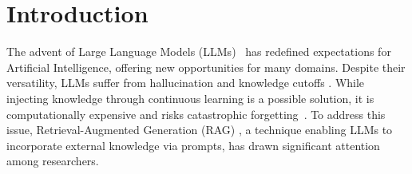 \section{Introduction}

The advent of Large Language Models (LLMs)~\cite{ouyang2022training,achiam2023gpt} has redefined expectations for Artificial Intelligence, offering new opportunities for many domains.
Despite their versatility, LLMs suffer from hallucination \cite{huang2025survey} and knowledge cutoffs \cite{cheng2024dated}.
While injecting knowledge through continuous learning is a possible solution, it is computationally expensive and risks catastrophic forgetting~\cite{kirkpatrick2017overcoming}.
To address this issue, Retrieval-Augmented Generation (RAG) \cite{guu2020retrieval,lewis2020retrieval}, a technique enabling LLMs to incorporate external knowledge via prompts, has drawn significant attention among researchers.



